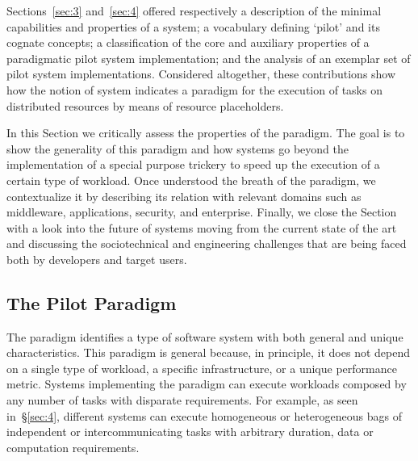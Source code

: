 \documentclass{sig-alternate}
\begin{document}


Sections~\ref{sec:3} and~\ref{sec:4} offered respectively a description
of the minimal capabilities and properties of a \pilot system; a
vocabulary defining `pilot' and its cognate concepts; a classification
of the core and auxiliary properties of a paradigmatic pilot system
implementation; and the analysis of an exemplar set of pilot system
implementations. Considered altogether, these contributions show how the
notion of \pilot system indicates a paradigm for the execution of tasks
on distributed resources by means of resource placeholders.

In this Section we critically assess the properties of the \pilot
paradigm. The goal is to show the generality of this paradigm and how
\pilot systems go beyond the implementation of a special purpose
trickery to speed up the execution of a certain type of workload. Once
understood the breath of the \pilot paradigm, we contextualize it
by describing its relation with relevant domains such as middleware,
applications, security, and enterprise. Finally, we close the Section
with a look into the future of \pilot systems moving from the current
state of the art and discussing the sociotechnical and engineering
challenges that are being faced both by developers and target users.

\subsection{The Pilot Paradigm}
\label{sec:5.1}

The \pilot paradigm identifies a type of software system with both
general and unique characteristics. This paradigm is general because, in
principle, it does not depend on a single type of workload, a specific
infrastructure, or a unique performance metric. Systems implementing the
\pilot paradigm can execute workloads composed by any number of
tasks with disparate requirements. For example, as seen
in~\S\ref{sec:4}, different \pilot systems can execute homogeneous or
heterogeneous bags of independent or intercommunicating tasks with
arbitrary duration, data or computation requirements.
\end{document}
